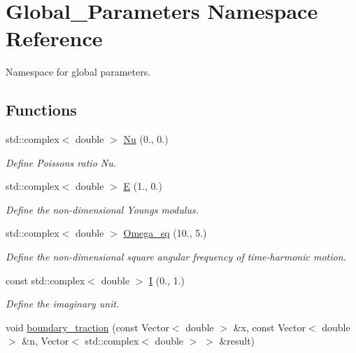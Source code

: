\hypertarget{namespaceGlobal__Parameters}{}\section{Global\+\_\+\+Parameters Namespace Reference}
\label{namespaceGlobal__Parameters}


Namespace for global parameters.  


\subsection*{Functions}
\begin{DoxyCompactItemize}
\item 
std\+::complex$<$ double $>$ \hyperlink{namespaceGlobal__Parameters_a5978c2a1498ec7775b228a11a3912209}{Nu} (0., 0.)
\begin{DoxyCompactList}\small\item\em Define Poisson\textquotesingle{}s ratio Nu. \end{DoxyCompactList}\item 
std\+::complex$<$ double $>$ \hyperlink{namespaceGlobal__Parameters_ac74d762d76b56416281173421b018460}{E} (1., 0.)
\begin{DoxyCompactList}\small\item\em Define the non-\/dimensional Young\textquotesingle{}s modulus. \end{DoxyCompactList}\item 
std\+::complex$<$ double $>$ \hyperlink{namespaceGlobal__Parameters_aa7f960ed4311ccf6e3dbf9371f13876a}{Omega\+\_\+sq} (10., 5.)
\begin{DoxyCompactList}\small\item\em Define the non-\/dimensional square angular frequency of time-\/harmonic motion. \end{DoxyCompactList}\item 
const std\+::complex$<$ double $>$ \hyperlink{namespaceGlobal__Parameters_a2ceef30cf51dfd432bafde39945a4e45}{I} (0., 1.)
\begin{DoxyCompactList}\small\item\em Define the imaginary unit. \end{DoxyCompactList}\item 
void \hyperlink{namespaceGlobal__Parameters_a579fa434bf9ee57e66d4bd42b208fc23}{boundary\+\_\+traction} (const Vector$<$ double $>$ \&x, const Vector$<$ double $>$ \&n, Vector$<$ std\+::complex$<$ double $>$ $>$ \&result)

\end{DoxyCompactItemize}
